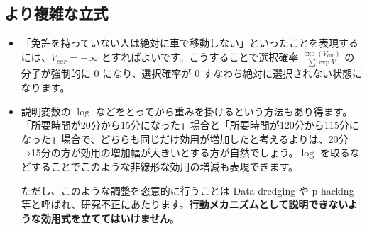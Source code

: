 \subsection{より複雑な立式}

\begin{itemize}
    \item 「免許を持っていない人は絶対に車で移動しない」といったことを表現するには、$V_{car}=-\infty$ とすればよいです。こうすることで選択確率 $\frac{\exp(V_{car})}{\sum \exp V}$ の分子が強制的に $0$ になり、選択確率が $0$ すなわち絶対に選択されない状態になります。

    \item 説明変数の $\log$ などをとってから重みを掛けるという方法もあり得ます。「所要時間が20分から15分になった」場合と「所要時間が120分から115分になった」場合で、どちらも同じだけ効用が増加したと考えるよりは、20分→15分の方が効用の増加幅が大きいとする方が自然でしょう。$\log$ を取るなどすることでこのような非線形な効用の増減も表現できます。

          ただし、このような調整を恣意的に行うことは Data dredging や p-hacking 等と呼ばれ、研究不正にあたります。\textbf{行動メカニズムとして説明できないような効用式を立ててはいけません}。
\end{itemize}
